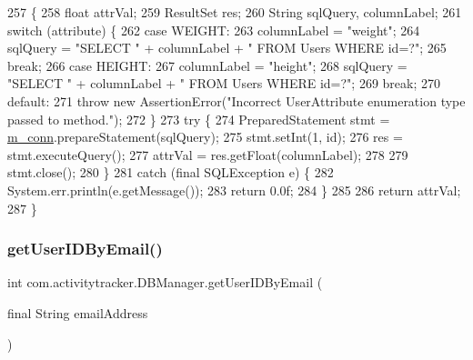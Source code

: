 \begin{DoxyCode}
257                                                                                     \{
258         \textcolor{keywordtype}{float} attrVal;
259         ResultSet res;
260         String sqlQuery, columnLabel;
261         \textcolor{keywordflow}{switch} (attribute) \{
262             \textcolor{keywordflow}{case} WEIGHT:
263                 columnLabel = \textcolor{stringliteral}{"weight"};
264                 sqlQuery = \textcolor{stringliteral}{"SELECT "} + columnLabel + \textcolor{stringliteral}{" FROM Users WHERE id=?"};
265                 \textcolor{keywordflow}{break};
266             \textcolor{keywordflow}{case} HEIGHT:
267                 columnLabel = \textcolor{stringliteral}{"height"};
268                 sqlQuery = \textcolor{stringliteral}{"SELECT "} + columnLabel + \textcolor{stringliteral}{" FROM Users WHERE id=?"};
269                 \textcolor{keywordflow}{break};
270             \textcolor{keywordflow}{default}:
271                 \textcolor{keywordflow}{throw} \textcolor{keyword}{new} AssertionError(\textcolor{stringliteral}{"Incorrect UserAttribute enumeration type passed to method."});
272         \}
273         \textcolor{keywordflow}{try} \{
274             PreparedStatement stmt = \mbox{\hyperlink{classcom_1_1activitytracker_1_1_d_b_manager_a064088d13ac09eb147fdc19268771521}{m\_conn}}.prepareStatement(sqlQuery);
275             stmt.setInt(1, \textcolor{keywordtype}{id});
276             res = stmt.executeQuery();
277             attrVal = res.getFloat(columnLabel);
278 
279             stmt.close();
280         \}
281         \textcolor{keywordflow}{catch} (\textcolor{keyword}{final} SQLException e) \{
282             System.err.println(e.getMessage());
283             \textcolor{keywordflow}{return} 0.0f;
284         \}
285 
286         \textcolor{keywordflow}{return} attrVal;
287     \}
\end{DoxyCode}
\mbox{\label{classcom_1_1activitytracker_1_1_d_b_manager_a195dcdeabdd00facb19d720976dd3f53}} 
\subsubsection{\texorpdfstring{get\+User\+I\+D\+By\+Email()}{getUserIDByEmail()}}
{\footnotesize\ttfamily int com.\+activitytracker.\+D\+B\+Manager.\+get\+User\+I\+D\+By\+Email (\begin{DoxyParamCaption}\item[{final String}]{email\+Address }\end{DoxyParamCaption})}

